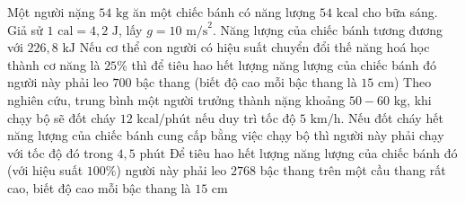 \begin{ex}
	Một người nặng $54\text{ kg}$ ăn một chiếc bánh có năng lượng $54\text{ kcal}$ cho bữa sáng. Giả sử $1\text{ cal} = 4{,}2\text{ J}$, lấy $g = 10\text{ m/s}^2$.
	\choiceTF
	{\True Năng lượng của chiếc bánh tương đương với $226{,}8\text{ kJ}$}
	{\True Nếu cơ thể con người có hiệu suất chuyển đổi thế năng hoá học thành cơ năng là $25\%$ thì để tiêu hao hết lượng năng lượng của chiếc bánh đó người này phải leo $700$ bậc thang (biết độ cao mỗi bậc thang là $15\text{ cm}$)}
	{\True Theo nghiên cứu, trung bình một người trưởng thành nặng khoảng $50 - 60\text{ kg}$, khi chạy bộ sẽ đốt cháy $12\text{ kcal/phút}$ nếu duy trì tốc độ $5\text{ km/h}$. Nếu đốt cháy hết năng lượng của chiếc bánh cung cấp bằng việc chạy bộ thì người này phải chạy với tốc độ đó trong $4{,}5\text{ phút}$}
	{Để tiêu hao hết lượng năng lượng của chiếc bánh đó (với hiệu suất $100\%$) người này phải leo $2768$ bậc thang trên một cầu thang rất cao, biết độ cao mỗi bậc thang là $15\text{ cm}$}
\end{ex}

